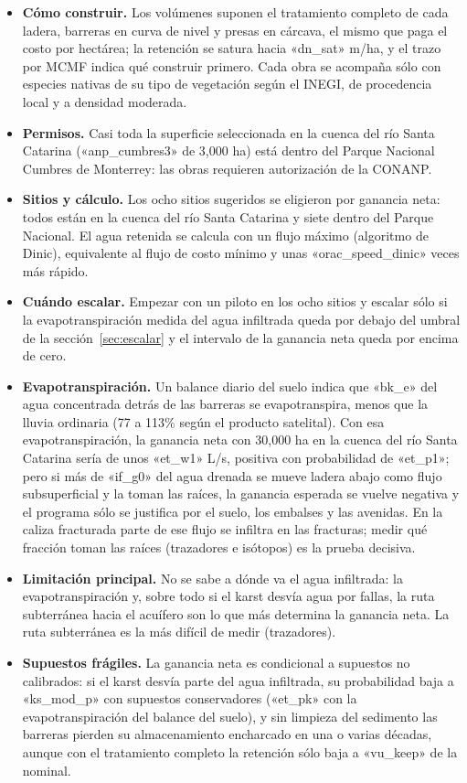 \begin{itemize}
  \item \textbf{Cómo construir.} Los volúmenes suponen el tratamiento completo de cada ladera, barreras en curva de nivel y presas en cárcava, el mismo que paga el costo por hectárea; la retención se satura hacia «dn_sat» m/ha, y el trazo por MCMF indica qué construir primero. Cada obra se acompaña sólo con especies nativas de su tipo de vegetación según el INEGI, de procedencia local y a densidad moderada.
  \item \textbf{Permisos.} Casi toda la superficie seleccionada en la cuenca del río Santa Catarina («anp_cumbres3» de 3,000 ha) está dentro del Parque Nacional Cumbres de Monterrey: las obras requieren autorización de la CONANP.
  \item \textbf{Sitios y cálculo.} Los ocho sitios sugeridos se eligieron por ganancia neta: todos están en la cuenca del río Santa Catarina y siete dentro del Parque Nacional. El agua retenida se calcula con un flujo máximo (algoritmo de Dinic), equivalente al flujo de costo mínimo y unas «orac_speed_dinic» veces más rápido.
  \item \textbf{Cuándo escalar.} Empezar con un piloto en los ocho sitios y escalar sólo si la evapotranspiración medida del agua infiltrada queda por debajo del umbral de la sección~\ref{sec:escalar} y el intervalo de la ganancia neta queda por encima de cero.
  \item \textbf{Evapotranspiración.} Un balance diario del suelo indica que «bk_e» del agua concentrada detrás de las barreras se evapotranspira, menos que la lluvia ordinaria (77 a 113\% según el producto satelital). Con esa evapotranspiración, la ganancia neta con 30,000 ha en la cuenca del río Santa Catarina sería de unos «et_w1» L/s, positiva con probabilidad de «et_p1»; pero si más de «if_g0» del agua drenada se mueve ladera abajo como flujo subsuperficial y la toman las raíces, la ganancia esperada se vuelve negativa y el programa sólo se justifica por el suelo, los embalses y las avenidas. En la caliza fracturada parte de ese flujo se infiltra en las fracturas; medir qué fracción toman las raíces (trazadores e isótopos) es la prueba decisiva.
  \item \textbf{Limitación principal.} No se sabe a dónde va el agua infiltrada: la evapotranspiración y, sobre todo si el karst desvía agua por fallas, la ruta subterránea hacia el acuífero son lo que más determina la ganancia neta. La ruta subterránea es la más difícil de medir (trazadores).
  \item \textbf{Supuestos frágiles.} La ganancia neta es condicional a supuestos no calibrados: si el karst desvía parte del agua infiltrada, su probabilidad baja a «ks_mod_p» con supuestos conservadores («et_pk» con la evapotranspiración del balance del suelo), y sin limpieza del sedimento las barreras pierden su almacenamiento encharcado en una o varias décadas, aunque con el tratamiento completo la retención sólo baja a «vu_keep» de la nominal.

\end{itemize}
